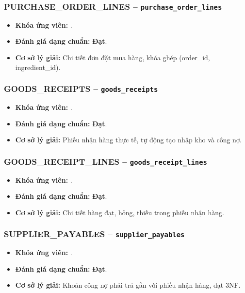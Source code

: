 \subsubsection{PURCHASE_ORDER_LINES -- \texttt{purchase\_order\_lines}}
\begin{itemize}
  \item \textbf{Khóa ứng viên:} \texttt{}.
  \item \textbf{Đánh giá dạng chuẩn:} \textbf{Đạt}.
  \item \textbf{Cơ sở lý giải:} Chi tiết đơn đặt mua hàng, khóa ghép (order_id, ingredient_id).
\end{itemize}

\subsubsection{GOODS_RECEIPTS -- \texttt{goods\_receipts}}
\begin{itemize}
  \item \textbf{Khóa ứng viên:} \texttt{}.
  \item \textbf{Đánh giá dạng chuẩn:} \textbf{Đạt}.
  \item \textbf{Cơ sở lý giải:} Phiếu nhận hàng thực tế, tự động tạo nhập kho và công nợ.
\end{itemize}

\subsubsection{GOODS_RECEIPT_LINES -- \texttt{goods\_receipt\_lines}}
\begin{itemize}
  \item \textbf{Khóa ứng viên:} \texttt{}.
  \item \textbf{Đánh giá dạng chuẩn:} \textbf{Đạt}.
  \item \textbf{Cơ sở lý giải:} Chi tiết hàng đạt, hỏng, thiếu trong phiếu nhận hàng.
\end{itemize}

\subsubsection{SUPPLIER_PAYABLES -- \texttt{supplier\_payables}}
\begin{itemize}
  \item \textbf{Khóa ứng viên:} \texttt{}.
  \item \textbf{Đánh giá dạng chuẩn:} \textbf{Đạt}.
  \item \textbf{Cơ sở lý giải:} Khoản công nợ phải trả gắn với phiếu nhận hàng, đạt 3NF.
\end{itemize}

